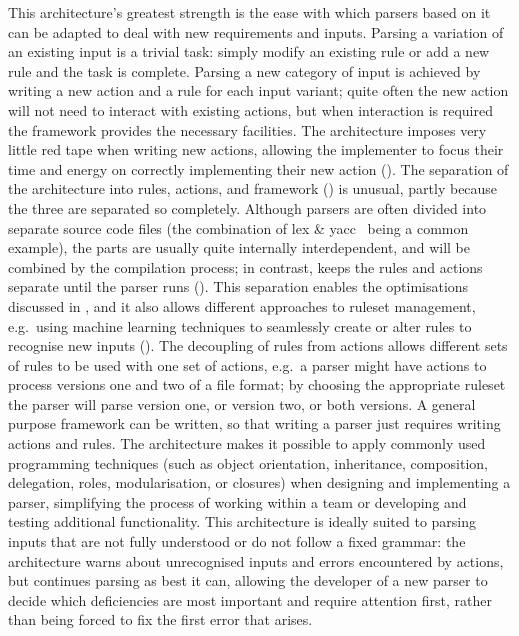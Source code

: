 This architecture's greatest strength is the ease with which parsers based
on it can be adapted to deal with new requirements and inputs.  Parsing a
variation of an existing input is a trivial task: simply modify an existing
rule or add a new rule and the task is complete.  Parsing a new category of
input is achieved by writing a new action and a rule for each input
variant; quite often the new action will not need to interact with existing
actions, but when interaction is required the framework provides the
necessary facilities.  The architecture imposes very little red tape when
writing new actions, allowing the implementer to focus their time and
energy on correctly implementing their new action ().  The separation of the architecture into rules, actions,
and framework () is unusual, partly because the
three are separated so completely.  Although parsers are often divided into
separate source code files (the combination of lex \&
yacc~\cite{lex-and-yacc-book} being a common example), the parts are
usually quite internally interdependent, and will be combined by the
compilation process; in contrast, \parsername{} keeps the rules and actions
separate until the parser runs ().
This separation enables the optimisations discussed in , and it also allows different approaches to ruleset management,
e.g.\ using machine learning techniques to seamlessly create or alter rules
to recognise new inputs ().
The decoupling of rules from actions allows different sets of rules to be
used with one set of actions, e.g.\ a parser might have actions to process
versions one and two of a file format; by choosing the appropriate ruleset
the parser will parse version one, or version two, or both versions.  A
general purpose framework can be written, so that writing a parser just
requires writing actions and rules.  The architecture makes it possible to
apply commonly used programming techniques (such as object orientation,
inheritance, composition, delegation, roles, modularisation, or closures)
when designing and implementing a parser, simplifying the process of
working within a team or developing and testing additional functionality.
This architecture is ideally suited to parsing inputs that are not fully
understood or do not follow a fixed grammar: the architecture warns about
unrecognised inputs and errors encountered by actions, but continues
parsing as best it can, allowing the developer of a new parser to decide
which deficiencies are most important and require attention first, rather
than being forced to fix the first error that arises.

